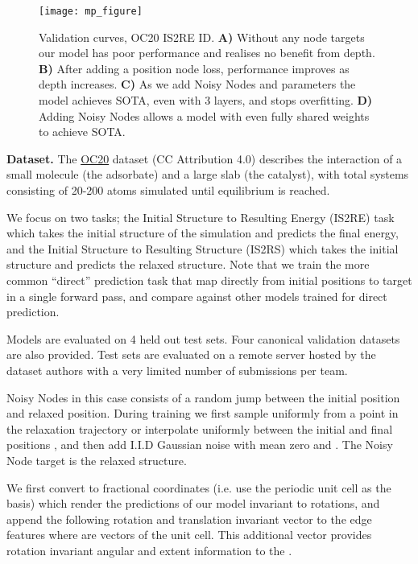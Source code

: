 \documentclass{article} \usepackage{iclr2022_conference,times}
\begin{document}
\begin{figure}[]
    \centering
    \texttt{[image: mp\_figure]}
    \caption{Validation curves, OC20 IS2RE ID. \textbf{A)} Without any node targets our model has poor performance and realises no benefit from depth. \textbf{B)} After adding a position node loss, performance improves as depth increases. \textbf{C)} As we add Noisy Nodes and parameters the model achieves SOTA, even with 3 layers, and stops overfitting. \textbf{D)} Adding Noisy Nodes allows a model with even fully shared weights to achieve SOTA.}
    \label{fig:experimental_results}
\end{figure}


\textbf{Dataset.} The \href{https://opencatalystproject.org/}{OC20} dataset \citep{Chanussot2020TheOC} (CC Attribution 4.0) describes the interaction of a small molecule (the adsorbate) and a large slab (the catalyst), with total systems consisting of 20-200 atoms simulated until equilibrium is reached.

We focus on two tasks; the Initial Structure to Resulting Energy (IS2RE) task which takes the initial structure of the simulation and predicts the final energy, and the Initial Structure to Resulting Structure (IS2RS) which takes the initial structure and predicts the relaxed structure.  Note that we train the more common ``direct'' prediction task that map directly from initial positions to target in a single forward pass, and compare against other models trained for direct prediction.

Models are evaluated on 4 held out test sets. Four canonical validation datasets are also provided. Test sets are evaluated on a remote server hosted by the dataset authors with a very limited number of submissions per team.

Noisy Nodes in this case consists of a random jump between the initial position and relaxed position. During training we first sample uniformly from a point in the relaxation trajectory or interpolate uniformly between the initial and final positions , and then add I.I.D Gaussian noise with mean zero and . The Noisy Node target is the relaxed structure.

We first convert to fractional coordinates (i.e. use the periodic unit cell as the basis) which render the predictions of our model invariant to rotations, and append the following rotation and translation invariant vector  to the edge features where  are vectors of the unit cell. This additional vector provides rotation invariant angular and extent information to the .
\end{document}
